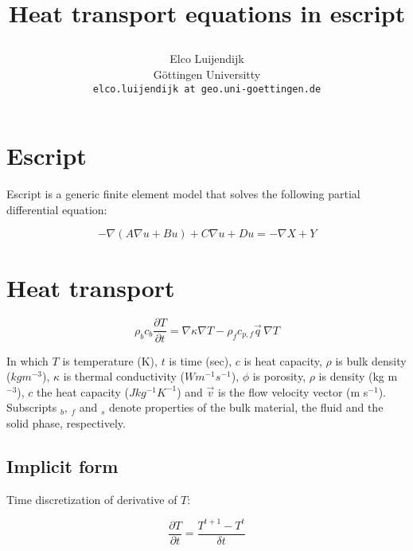 \documentclass[11pt]{article}
\begin{document}
\title{\Large Heat transport equations in escript
\author{
\large Elco Luijendijk\\
\normalsize G\"ottingen Universitty\\
\texttt{elco.luijendijk at geo.uni-goettingen.de}\\
}
\date{}
}

\maketitle


\section{Escript}

Escript is a generic finite element model that solves the following partial differential equation:

\begin{equation}
    - \nabla (A \nabla u + B u ) + C \nabla u + D u = - \nabla X + Y
\end{equation}


\pagebreak

\section{Heat transport}


\begin{equation}
	\rho _b c_b \frac{\partial{T}} {\partial{t}}=\nabla \kappa \nabla T - \rho_{f} c_{p,f} \vec q \, \nabla T
	\label{eq:HFandAdvection}
\end{equation}

In which $T$ is temperature (K), $t$ is time (sec), $c$ is heat capacity, $\rho$ is bulk density (${kg} m^{-3}$), $\kappa$ is thermal conductivity ($W m^{-1} s^{-1}$), $\phi$ is porosity, $\rho$ is density (kg m$^{-3}$), $c$ the heat capacity ($J kg^{-1} K^{-1}$) and $\vec v$ is the flow velocity vector (m s$^{-1}$). Subscripts $_b$, $_f$ and $_s$ denote properties of the bulk material, the fluid and the solid phase, respectively.


\subsection{Implicit form}

Time discretization of derivative of $T$:

\begin{equation}
    \frac{ \partial T } {\partial t} = \frac { T^{t+1} - T^t} {\delta t}
\end{equation}
\end{document}

